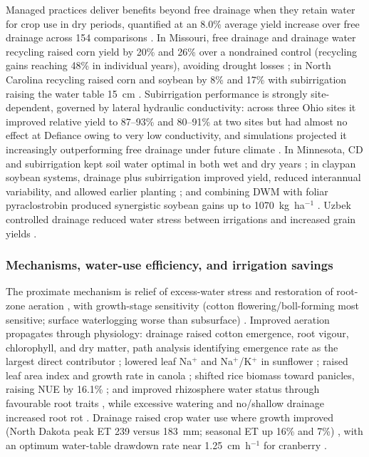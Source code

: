 Managed practices deliver benefits beyond free drainage when they retain water
for crop use in dry periods, quantified at an 8.0\% average yield increase over
free drainage across 154 comparisons \parencite{Singh2022b}. In Missouri, free
drainage and drainage water recycling raised corn yield by 20\% and 26\% over a
nondrained control (recycling gains reaching 48\% in individual years), avoiding
drought losses \parencite{Kaur2021}; in North Carolina recycling raised corn and
soybean by 8\% and 17\% with subirrigation raising the water table 15~cm
\parencite{Moursi2024}. Subirrigation performance is strongly site-dependent,
governed by lateral hydraulic conductivity: across three Ohio sites it improved
relative yield to 87--93\% and 80--91\% at two sites but had almost no effect at
Defiance owing to very low conductivity, and simulations projected it
increasingly outperforming free drainage under future climate
\parencite{Gunn2018,Gunn2019}. In Minnesota, CD and subirrigation kept soil water
optimal in both wet and dry years \parencite{Niaghi2019}; in claypan soybean
systems, drainage plus subirrigation improved yield, reduced interannual
variability, and allowed earlier planting \parencite{Nelson2011}; and combining
DWM with foliar pyraclostrobin produced synergistic soybean gains up to
1070~kg~ha$^{-1}$ \parencite{Nelson2011b}. Uzbek controlled drainage reduced
water stress between irrigations and increased grain yields
\parencite{Dukhovny2018}.

\subsubsection{Mechanisms, water-use efficiency, and irrigation savings}

The proximate mechanism is relief of excess-water stress and restoration of
root-zone aeration \parencite{BENNETT1982,DarziNaftchali2014}, with growth-stage
sensitivity (cotton flowering/boll-forming most sensitive; surface waterlogging
worse than subsurface) \parencite{Qian2021}. Improved aeration propagates through
physiology: drainage raised cotton emergence, root vigour, chlorophyll, and
dry matter, path analysis identifying emergence rate as the largest direct
contributor \parencite{Yang2022}; lowered leaf Na$^+$ and Na$^+$/K$^+$ in
sunflower \parencite{Islam2022}; raised leaf area index and growth rate in canola
\parencite{Asgari2021}; shifted rice biomass toward panicles, raising NUE by
16.1\% \parencite{DarziNaftchali2022b,Qi2025b}; and improved rhizosphere water
status through favourable root traits \parencite{Chen2025b}, while excessive
watering and no/shallow drainage increased root rot \parencite{Han2017}. Drainage
raised crop water use where growth improved (North Dakota peak ET 239 versus
183~mm; seasonal ET up 16\% and 7\%) \parencite{Rijal2012,Yang2017,Yang2022},
with an optimum water-table drawdown rate near 1.25~cm~h$^{-1}$ for cranberry
\parencite{Bulot2017}.

